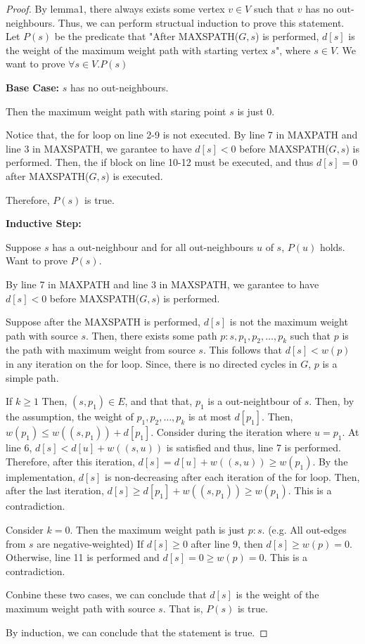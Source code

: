 \documentclass[10pt]{article}
\begin{document}
\begin{proof}
	By lemma1, there always exists some vertex $v \in V$ such that $v$ has no
	out-neighbours. 
	Thus, we can perform structual induction to prove this statement. 
	Let $P(s)$ be the predicate that "After MAXSPATH($G, s$) is performed,
	$d[s]$ is the weight of the maximum weight path with starting vertex $s$",
	where $s \in V$. 
	We want to prove $\forall s \in V. P(s)$

	\textbf{Base Case:} $s$ has no out-neighbours.
	\begin{addmargin}[1em]{0em}
		Then the maximum weight path with staring point $s$ is just 0. 
		
		Notice that, the for loop on line 2-9 is not executed.
		By line 7 in MAXPATH and line 3 in MAXSPATH, we garantee to have
		$d[s] < 0$ before MAXSPATH($G, s$) is performed. 
		Then, the if block on line 10-12 must be executed, and thus $d[s] = 0$
		after MAXSPATH($G, s$) is executed. 

		Therefore, $P(s)$ is true.
	\end{addmargin}

	\textbf{Inductive Step:}
	\begin{addmargin}[1em]{0em}
		Suppose $s$ has a out-neighbour and for all out-neighbours $u$ of $s$,
		$P(u)$ holds. 
		Want to prove $P(s)$.

		By line 7 in MAXPATH and line 3 in MAXSPATH, we garantee to have $d[s]
		< 0$ before MAXSPATH($G, s$) is performed.

		Suppose after the MAXSPATH is performed, $d[s]$ is not the maximum
		weight path with source $s$.
		Then, there exists some path $p: s, p_1, p_2, \ldots, p_k$ such that
		$p$ is the path with maximum weight from source $s$. 
		This follows that $d[s] < w(p)$ in any iteration on the for loop.
		Since, there is no directed cycles in $G$, $p$ is a simple path. 
		
		If $k \geq 1$
		Then, $(s, p_1) \in E$, and that that, $p_1$ is a out-neightbour of
		$s$. 
		Then, by the assumption, the weight of $p_1, p_2, \ldots, p_k$ is at
		most $d[p_1]$.
		Then, $w(p_1) \leq w((s, p_1)) + d[p_1]$.
		Consider during the iteration where $u = p_1$.
		At line 6, $d[s] < d[u] + w((s, u))$ is  satisfied and thus, line
		7 is performed.
		Therefore, after this iteration, $d[s] = d[u] + w((s, u)) \geq w(p_1)$.
		By the implementation, $d[s]$ is non-decreasing after each iteration of
		the for loop.
		Then, after the last iteration, $d[s] \geq d[p_1] + w((s, p_1)) \geq
		w(p_1)$.
		This is a contradiction. 

		Consider $k = 0$. 
		Then the maximum weight path is just $p: s$.
		(e.g. All out-edges from $s$ are negative-weighted) 
		If $d[s] \geq 0$ after line 9, then $d[s] \geq w(p) = 0$.
		Otherwise, line 11 is performed and $d[s] = 0 \geq w(p) = 0$.
		This is a contradiction. 

		Conbine these two cases, we can conclude that $d[s]$ is the weight of
		the maximum weight path with source $s$.
		That is, $P(s)$ is true.
	\end{addmargin}

	By induction, we can conclude that the statement is true. 
\end{proof}
\end{document}

